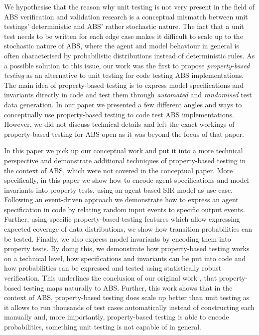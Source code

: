 We hypothesise that the reason why unit testing is not very present in the field of ABS verification and validation research is a conceptual mismatch between unit testings' deterministic and ABS' rather stochastic nature. The fact that a unit test needs to be written for each edge case makes it difficult to scale up to the stochastic nature of ABS, where the agent and model behaviour in general is often characterised by probabilistic distributions instead of deterministic rules. As a possible solution to this issue, our work \cite{thaler_show_2019} was the first to propose \textit{property-based testing} as an alternative to unit testing for code testing ABS implementations. The main idea of property-based testing is to express model specifications and invariants directly in code and test them through \textit{automated} and \textit{randomised} test data generation. In our paper \cite{thaler_show_2019} we presented a few different angles and ways to conceptually use property-based testing to code test ABS implementations. However, we did not discuss technical details and left the exact workings of property-based testing for ABS open as it was beyond the focus of that paper.

In this paper we pick up our conceptual work \cite{thaler_show_2019} and put it into a more technical perspective and demonstrate additional techniques of property-based testing in the context of ABS, which were not covered in the conceptual paper. More specifically, in this paper we show how to encode agent specifications and model invariants into property tests, using an agent-based SIR model \cite{macal_agent-based_2010} as use case. Following an event-driven \cite{meyer_event-driven_2014} approach we demonstrate how to express an agent specification in code by relating random input events to specific output events. Further, using specific property-based testing features which allow expressing expected coverage of data distributions, we show how transition probabilities can be tested. Finally, we also express model invariants by encoding them into property tests. By doing this, we demonstrate how property-based testing works on a technical level, how specifications and invariants can be put into code and how probabilities can be expressed and tested using statistically robust verification. This underlines the conclusion of our original work \cite{thaler_show_2019}, that property-based testing maps naturally to ABS. Further, this work shows that in the context of ABS, property-based testing does scale up better than unit testing as it allows to run thousands of test cases automatically instead of constructing each manually and, more importantly, property-based testing is able to encode probabilities, something unit testing is not capable of in general.

